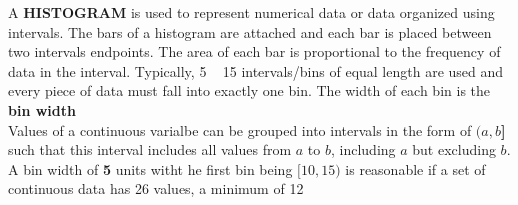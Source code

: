 A \textbf{HISTOGRAM} is used to represent numerical data or data organized using intervals. The bars of a 
histogram are attached and each bar is placed between two intervals endpoints. The area of each bar is proportional
to the frequency of data in the interval. Typically, 5 ~ 15 intervals/bins of equal length are used and every piece
of data must fall into exactly one bin. The width of each bin is the \textbf{bin width} \\

Values of a continuous varialbe can be grouped into intervals in the form of \textbf{$(a, b$]} such that this interval 
includes all values from $a$ to $b$, including $a$ but excluding $b$.\\

A bin width of \textbf{5} units witht he first bin being $[10, 15)$ is reasonable if a set of continuous data 
has 26 values, a minimum of 12